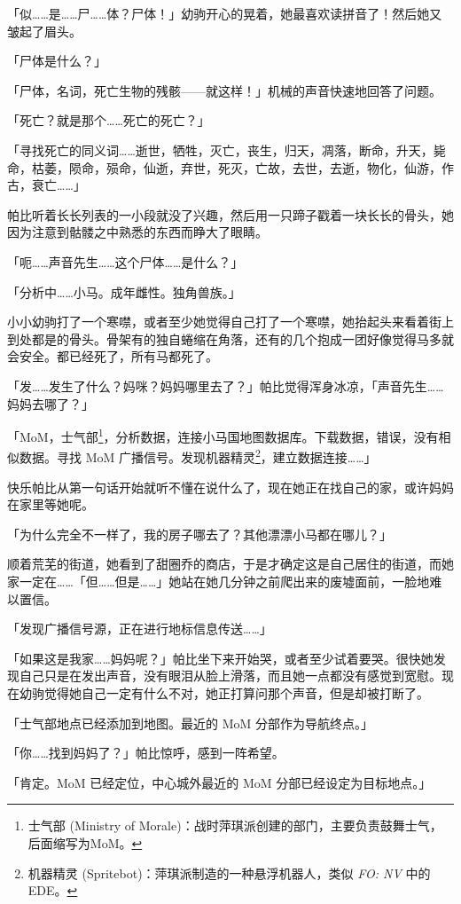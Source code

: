 「似……是……尸……体？尸体！」幼驹开心的晃着，她最喜欢读拼音了！然后她又皱起了眉头。

「尸体是什么？」

「{\mt 尸体，名词，死亡生物的残骸——就这样！}」机械的声音快速地回答了问题。

「死亡？就是那个……死亡的死亡？」

「{\mt 寻找死亡的同义词……逝世，牺牲，灭亡，丧生，归天，凋落，断命，升天，毙命，枯萎，陨命，殒命，仙逝，弃世，死灭，亡故，去世，去逝，物化，仙游，作古，衰亡……}」

帕比听着长长列表的一小段就没了兴趣，然后用一只蹄子戳着一块长长的骨头，她因为注意到骷髅之中熟悉的东西而睁大了眼睛。

「呃……声音先生……这个尸体……是什么？」

「{\mt 分析中……小马。成年雌性。独角兽族。}」

小小幼驹打了一个寒噤，或者至少她觉得自己打了一个寒噤，她抬起头来看着街上到处都是的骨头。骨架有的独自蜷缩在角落，还有的几个抱成一团好像觉得马多就会安全。都已经死了，所有马都死了。

「发……发生了什么？妈咪？妈妈哪里去了？」帕比觉得浑身冰凉，「声音先生……妈妈去哪了？」

「{\mt MoM，士气部\footnote{士气部 (Ministry of Morale)：战时萍琪派创建的部门，主要负责鼓舞士气，后面缩写为MoM。}，分析数据，连接小马国地图数据库。下载数据，错误，没有相似数据。寻找 MoM 广播信号。发现机器精灵\footnote{机器精灵 (Spritebot)：萍琪派制造的一种悬浮机器人，类似 \emph{FO: NV} 中的 EDE。}，建立数据连接……}」

快乐帕比从第一句话开始就听不懂在说什么了，现在她正在找自己的家，或许妈妈在家里等她呢。

「为什么完全不一样了，我的房子哪去了？其他漂漂小马都在哪儿？」

顺着荒芜的街道，她看到了甜圈乔的商店，于是才确定这是自己居住的街道，而她家一定在……「但……但是……」她站在她几分钟之前爬出来的废墟面前，一脸地难以置信。

「{\mt 发现广播信号源，正在进行地标信息传送……}」

「如果这是我家……妈妈呢？」帕比坐下来开始哭，或者至少试着要哭。很快她发现自己只是在发出声音，没有眼泪从脸上滑落，而且她一点都没有感觉到宽慰。现在幼驹觉得她自己一定有什么不对，她正打算问那个声音，但是却被打断了。

「{\mt 士气部地点已经添加到地图。最近的 MoM 分部作为导航终点。}」

「你……找到妈妈了？」帕比惊呼，感到一阵希望。

「{\mt 肯定。MoM 已经定位，中心城外最近的 MoM 分部已经设定为目标地点。}」

